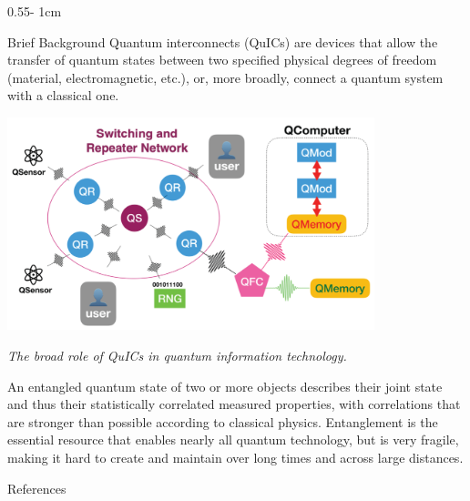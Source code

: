 \documentclass{../psuposter}
\begin{document}
\begin{frame}
\begin{columns}[t, totalwidth=\textwidth]
\begin{column}{0.55\textwidth - 1cm}
    \begin{block}{Brief Background}
    	Quantum interconnects (QuICs) are devices that allow the transfer of quantum states between two specified physical degrees of freedom (material, electromagnetic, etc.), or, more broadly, connect a quantum system with a classical one. \cite{awschalomDevelopmentQuantumInterconnects2021} 
        \begin{center}
		   	\includegraphics[width=0.8\textwidth]{images/background}    		

			\textit{The broad role of QuICs in quantum information technology. \cite{awschalomDevelopmentQuantumInterconnects2021}}
    	\end{center}
		An entangled quantum state of two or more objects describes their joint state and thus their statistically correlated measured properties, with correlations that are stronger than possible according to classical physics. Entanglement is the essential resource that enables nearly all quantum technology, but is very fragile, making it hard to create and maintain over long times and across large distances. \cite{awschalomDevelopmentQuantumInterconnects2021}
    \end{block}


    \begin{block}{References}
        
%        
		
    \end{block}


\end{column}
\end{columns}
\end{frame}
\end{document}
